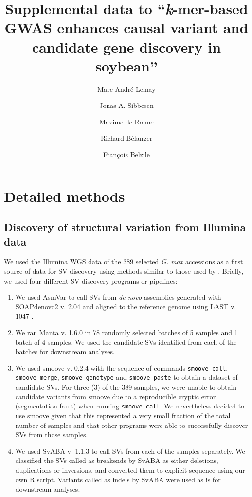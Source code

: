 \documentclass[12pt]{article}
\title{Supplemental data to ``\emph{k}-mer-based GWAS enhances causal variant and candidate gene discovery in soybean''}
\author{Marc-André Lemay \and Jonas A. Sibbesen \and Maxime de Ronne \and Richard Bélanger \and François Belzile}
\date{}
\begin{document}
\newcommand{\getvar}[1]{\DTLfetch{variables}{key}{#1}{value}}

\maketitle \thispagestyle{empty}

\listoftables
\listoffigures

\thispagestyle{empty}

\section{Detailed methods}
\label{annexe-sv-gwas-detailed-methods}

\subsection{Discovery of structural variation from Illumina data}
\label{sv-gwas-sv-discovery-illumina}

We used the Illumina WGS data of the 389 selected \emph{G. max} accessions as a
first source of data for SV discovery using methods similar to those used by
\cite{lemay2022}.  Briefly, we used four different SV discovery programs or
pipelines: 

\begin{enumerate}

\item We used AsmVar \citep[version of 2015-04-16, ][]{liu2015} to call SVs
	from \emph{de novo} assemblies generated with SOAPdenovo2 v. 2.04
		\citep{luo2012} and aligned to the reference genome using LAST
		v. 1047 \citep{kielbasa2011}.
\item We ran Manta v. 1.6.0 \citep{chen2016} in 78 randomly selected batches of
	5 samples and 1 batch of 4 samples. We used the candidate SVs
		identified from each of the batches for downstream analyses.
\item We used smoove v. 0.2.4 \citep{pedersen2019} with the sequence of
	commands \texttt{smoove call}, \texttt{smoove merge}, \texttt{smoove
		genotype} and \texttt{smoove paste} to obtain a dataset of
		candidate SVs. For three (3) of the 389 samples, we were unable
		to obtain candidate variants from smoove due to a reproducible
		cryptic error (segmentation fault) when running \texttt{smoove
		call}. We nevertheless decided to use smoove given that this
		represented a very small fraction of the total number of
		samples and that other programs were able to successfully
		discover SVs from those samples.
\item We used SvABA v. 1.1.3 \citep{wala2018} to call SVs from each of the
	samples separately. We classified the SVs called as breakends by SvABA
		as either deletions, duplications or inversions, and converted
		them to explicit sequence using our own R script. Variants
		called as indels by SvABA were used as is for downstream
		analyses.
\end{enumerate}
\end{document}
